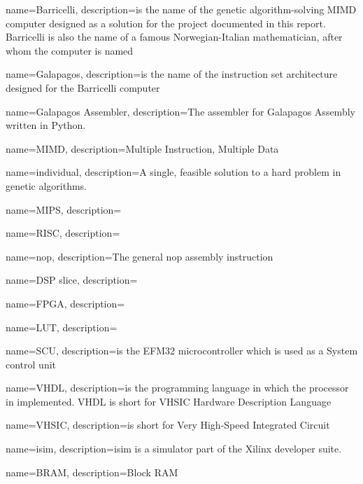 {
name=Barricelli,
description={is the name of the genetic algorithm-solving MIMD computer designed as a solution for the project documented in this report. Barricelli is also the name of a famous Norwegian-Italian mathematician, after whom the computer is named}
}

{
name=Galapagos,
description={is the name of the instruction set architecture designed for the Barricelli computer}
}

{
name=Galapagos Assembler,
description={The assembler for Galapagos Assembly written in Python.}
}

{
name=MIMD,
description={Multiple Instruction, Multiple Data}
}

{
name=individual,
description={A single, feasible solution to a hard problem in genetic algorithms.}
}

{
name=MIPS,
description={}
}

{
name=RISC,
description={}
}

{
name=nop,
description={The general nop assembly instruction }
}

{
name=DSP slice,
description={}
}

{
name=FPGA,
description={}
}

{
name=LUT,
description={}
}

{
name=SCU,
description={is the EFM32 microcontroller which is used as a System control unit}
}

{
name=VHDL,
description={is the programming language in which the processor in implemented. VHDL is short for \gls{VHSIC} Hardware Description Language}
}

{
name=VHSIC,
description={is short for Very High-Speed Integrated Circuit}
}

{
name=isim,
description={isim is a simulator part of the Xilinx developer suite.}
}

{
name=BRAM,
description={Block RAM }
}

